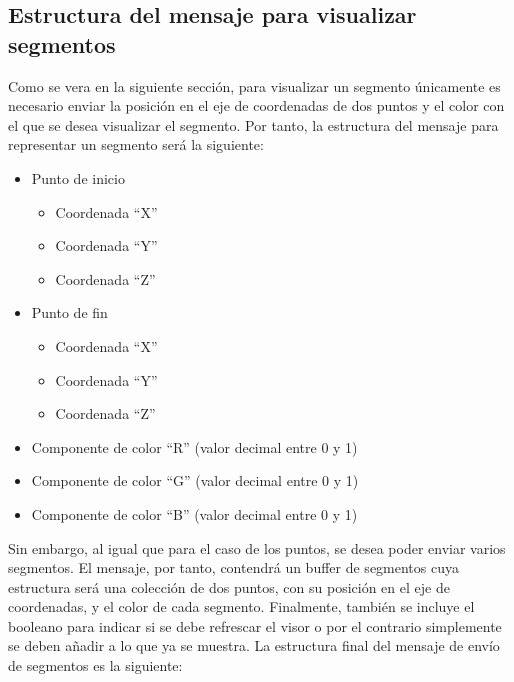 \subsection{Estructura del mensaje para visualizar segmentos}
Como se vera en la siguiente sección, para visualizar un segmento únicamente es necesario enviar la posición en el eje de coordenadas de dos puntos y el color con el que se desea visualizar el segmento. Por tanto, la estructura del mensaje para representar un segmento será la siguiente:
\begin{itemize}
\item Punto de inicio
	\begin{itemize}
		\item Coordenada ``X''
		\item Coordenada ``Y''
		\item Coordenada ``Z''
	\end{itemize}
\item Punto de fin
	\begin{itemize}
		\item Coordenada ``X''
		\item Coordenada ``Y''
		\item Coordenada ``Z''
	\end{itemize}
\item Componente de color ``R'' (valor decimal entre 0 y 1)
\item Componente de color ``G'' (valor decimal entre 0 y 1)
\item Componente de color ``B'' (valor decimal entre 0 y 1)
\end{itemize}
Sin embargo, al igual que para el caso de los puntos, se desea poder enviar varios segmentos. El mensaje, por tanto, contendrá un buffer de segmentos cuya estructura será una colección de dos puntos, con su posición en el eje de coordenadas, y el color de cada segmento.
Finalmente, también se incluye el booleano para indicar si se debe refrescar el visor o por el contrario simplemente se deben añadir a lo que ya se muestra.
La estructura final del mensaje de envío de segmentos es la siguiente:
